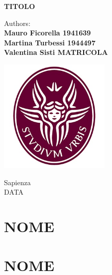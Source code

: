 \documentclass[11pt, a4paper]{article}
\begin{document}
\begin{titlepage}
	\begin{center}
		\vspace*{1cm}
		
		\Huge
		\textbf{TITOLO}
		\vspace{1.5cm}
		
		\Large
		Authors:\\
		\textbf{Mauro Ficorella 1941639}\\
		\textbf{Martina Turbessi 1944497}\\
		\textbf{Valentina Sisti MATRICOLA}\\
		\vspace{0.5cm}
		
		\vfill
		
		\includegraphics[width=0.4\textwidth]{Images/Logo.jpg}
		
		\vfill
		
		\vspace{0.8cm}
		
		\Large
		Sapienza\\
		DATA
	\end{center}
\end{titlepage}



\newpage
\pagestyle{fancy}
\fancyhf{}

\section*{NOME}


\newpage
\pagestyle{fancy}
\fancyhf{}

\section*{NOME}
\end{document}
